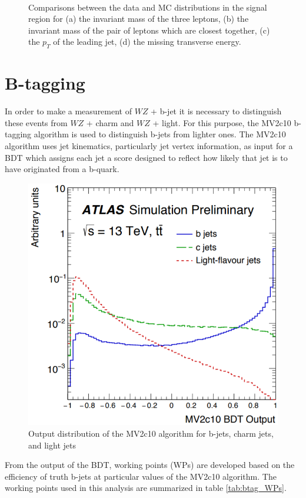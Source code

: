 \documentclass[NOTE, atlasdraft=true, texlive=2016, UKenglish]{\ATLASLATEXPATH atlasdoc}
\begin{document}
\begin{figure}[H]
\begin{subfigure}{.48\textwidth}
        \caption{}
        \label{fig:met}
    \end{subfigure}\\
    \caption{Comparisons between the data and MC distributions in the signal region for (a) the invariant mass of the three leptons, (b) the invariant mass of the pair of leptons which are closest together, (c) the $p_T$ of the leading jet, (d) the missing transverse energy.}
    \label{sr_kinematics}
\end{figure}

\section{B-tagging}
\label{sec:btagging}

In order to make a measurement of $WZ$ + b-jet it is necessary to distinguish these events from $WZ$ + charm and $WZ$ + light. For this purpose, the MV2c10 b-tagging algorithm is used to distinguish b-jets from lighter ones. The MV2c10 algorithm uses jet kinematics, particularly jet vertex information, as input for a BDT which assigns each jet a score designed to reflect how likely that jet is to have originated from a b-quark. 

\begin{figure}[H]
    \centering
    \includegraphics[width=0.54\linewidth]{MV2c10_output.png}
    \caption{Output distribution of the MV2c10 algorithm for b-jets, charm jets, and light jets}
    \label{fig:MV2c10}
\end{figure}

From the output of the BDT, working points (WPs) are developed based on the efficiency of truth b-jets at particular values of the MV2c10 algorithm. The working points used in this analysis are summarized in table \ref{tab:btag_WPs}. 
\end{document}
